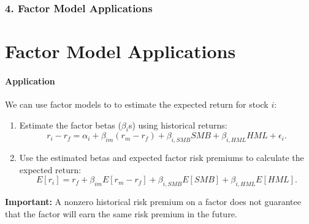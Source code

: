 \documentclass{beamer}
\begin{document}
\begin{frame}[t]
    \frametitle{4. Factor Model Applications}
    \section{Factor Model Applications}
    \framesubtitle{Application}

    We can use factor models to to estimate the expected return for stock $i$:
    
    \begin{enumerate}
        \item Estimate the factor betas ($\beta_i$s) using historical returns:
        \[
        r_i-r_f
        =
        \alpha_i
        +\beta_{im}(r_m-r_f)
        +\beta_{i,SMB}SMB
        +\beta_{i,HML}HML
        +\epsilon_i.
        \]
        
        \item Use the estimated betas and expected factor risk premiums to calculate the expected return:
        \[
        E[r_i]
        =
        r_f
        +\beta_{im}E[r_m-r_f]
        +\beta_{i,SMB}E[SMB]
        +\beta_{i,HML}E[HML].
        \]
    \end{enumerate}

    \vspace{0.5em}
    \textbf{Important:} A nonzero historical risk premium on a factor does not guarantee that the factor will earn the same risk premium in the future.

\end{frame}
\end{document}
